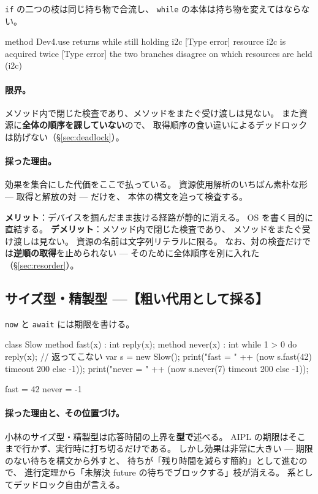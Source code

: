\documentclass[11pt,a4paper]{ltjsarticle}
\theoremstyle{definition}
\theoremstyle{remark}
\begin{document}
\texttt{if} の二つの枝は同じ持ち物で合流し、
\texttt{while} の本体は持ち物を変えてはならない。

\begin{term}
 method Dev4.use returns while still holding i2c
[Type error] resource i2c is acquired twice
[Type error] the two branches disagree on which resources are held (i2c)
\end{term}

\paragraph{限界。}
メソッド内で閉じた検査であり、メソッドをまたぐ受け渡しは見ない。
また資源に\textbf{全体の順序を課していない}ので、
取得順序の食い違いによるデッドロックは防げない（\S\ref{sec:deadlock}）。

\paragraph{採った理由。}
効果を集合にした代価をここで払っている。
資源使用解析のいちばん素朴な形 --- 取得と解放の対 --- だけを、
本体の構文を追って検査する。

\textbf{メリット}：デバイスを掴んだまま抜ける経路が静的に消える。
OS を書く目的に直結する。
\textbf{デメリット}：メソッド内で閉じた検査であり、
メソッドをまたぐ受け渡しは見ない。
資源の名前は文字列リテラルに限る。
なお、対の検査だけでは\textbf{逆順の取得}を止められない ---
そのために全体順序を別に入れた（\S\ref{sec:resorder}）。

\subsection{サイズ型・精製型 ---【粗い代用として採る】}
\label{sec:deadline}


\texttt{now} と \texttt{await} には期限を書ける。

\begin{aipl}
class Slow {
  method fast(x) : int { reply(x); }
  method never(x) : int { while 1 > 0 do { } reply(x); }   // 返ってこない
}
var s = new Slow();
print("fast  = " ++ (now s.fast(42) timeout 200 else -1));
print("never = " ++ (now s.never(7) timeout 200 else -1));
\end{aipl}
\begin{term}
fast  = 42
never = -1
\end{term}

\paragraph{採った理由と、その位置づけ。}
小林のサイズ型・精製型は応答時間の上界を\textbf{型で}述べる。
AIPL の期限はそこまで行かず、実行時に打ち切るだけである。
しかし効果は非常に大きい --- 期限のない待ちを構文から外すと、
待ちが「残り時間を減らす簡約」として進むので、
進行定理から「未解決 future の待ちでブロックする」枝が消える。
系としてデッドロック自由が言える。
\end{document}
